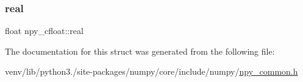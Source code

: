 \mbox{\label{structnpy__cfloat_a363207c3f19ae8b58dedc9fcb350b0c9}} 
\subsubsection{\texorpdfstring{real}{real}}
{\footnotesize\ttfamily float npy\+\_\+cfloat\+::real}



The documentation for this struct was generated from the following file\+:\begin{DoxyCompactItemize}
\item 
venv/lib/python3./site-\/packages/numpy/core/include/numpy/\hyperlink{npy__common_8h}{npy\+\_\+common.\+h}\end{DoxyCompactItemize}
